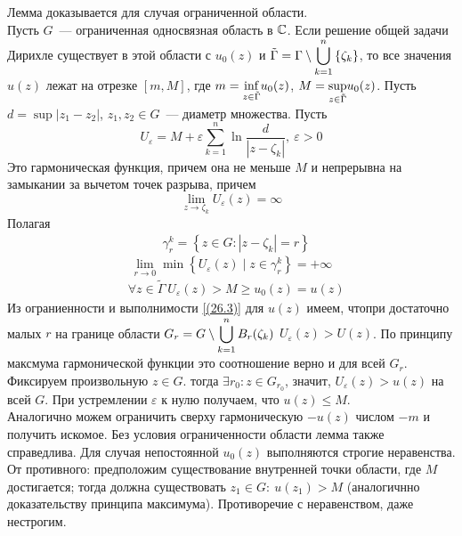 \lemma
Лемма доказывается для случая ограниченной области.
\\
Пусть $G$~--- ограниченная односвязная область в $\mathbb{C}$. Если решение общей
задачи Дирихле существует в этой области с $u_0(z)$ и $\tilde{\Gamma} = \Gamma
\setminus \displaystyle \bigcup_{k=1}^n \left\{ \zeta_k \right\}$, то все значения $u(z)$
лежат на отрезке $\left[ m, M \right]$, где $m = \underset{z \in\tilde{\Gamma}}{\inf} u_0(z)$, $M = \underset{z \in\tilde{\Gamma}}{\sup}u_0(z)$.
\pr
Пусть $d = \sup \left| z_1-z_2 \right|$, $z_1, z_2 \in G$~--- диаметр множества.
Пусть
\begin{equation}\label{(26.1)}
    U_\varepsilon = M + \varepsilon \sum_{k=1}^n \ln \frac{d}{\left| z-\zeta_k\right|}, \ \varepsilon > 0
\end{equation}
Это гармоническая функция, причем она не меньше $M$ и непрерывна на замыкании
за вычетом точек разрыва, причем
\begin{equation}\label{(26.2)}
    \lim_{z \to \zeta_k} U_\varepsilon(z) = \infty
\end{equation}
Полагая
\begin{align*}
  & \gamma_r^k = \left\{ z \in G: \left| z - \zeta_k \right| = r\right\}
\end{align*}
\begin{equation}\label{(26.3)}
    \lim_{r \to 0}\min \left\{ U_\varepsilon(z) \mid z \in \gamma_r^k \right\} = +\infty
\end{equation}
\begin{align*}
    & \forall z \in \tilde{\Gamma} \ U_\varepsilon(z) > M\geq u_0(z) = u(z)
\end{align*}
Из ограниенности и выполнимости \eqref{(26.3)} для $u(z)$ имеем, чтопри
достаточно малых $r$ на границе области $G_r = G \setminus \displaystyle \bigcup_{k=1}^n
B_r(\zeta_k)$ $U_\varepsilon(z) > U(z)$. По принципу максмума гармонической
функции это соотношение верно и для всей $G_r$.
\\
Фиксируем произвольную  $z \in G$. тогда $\exists r_0: z \in G_{r_0}$, значит,
$U_\varepsilon(z) > u(z)$ на всей $G$. При устремлении $\varepsilon$ к нулю
получаем, что $u(z) \leq M$.
\\
Аналогично можем ограничить сверху гармоническую $-u(z)$ числом $-m$ и получить
искомое.
\Note
Без условия ограниченности области лемма также справедлива.
\corollary
Для случая непостоянной $u_0(z)$ выполняются строгие неравенства.
\pr
От противного: предположим существование внутренней точки области, где $M$
достигается; тогда должна существовать $z_1 \in G: \ u(z_1) > M$ (аналогичнно
доказательству принципа максимума). Противоречие с неравенством, даже нестрогим.    
